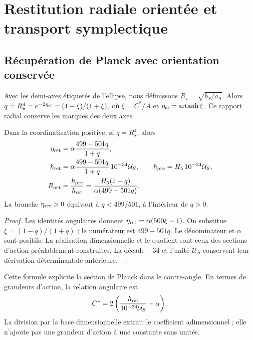 \section{Restitution radiale orientée et transport symplectique}
\subsection{Récupération de Planck avec orientation conservée}

Avec les demi-axes étiquetés de l’ellipse, nous définissons
\(R_\star=\sqrt{b_S/a_S}\). Alors
\(q=R_\star^4=e^{-2\eta_{\rm el}}=(1-\xi)/(1+\xi)\),
où \(\xi=C^*/A\) et \(\eta_{\rm el}=\operatorname{artanh}\xi\).
Ce rapport radial conserve les marques des deux axes.

\begin{theorem}
\label{rec:thm:accion}
Dans la coordinatisation positive, si \(q=R_\star^4\), alors
\begin{align}
 \eta_{\rm ret}&=\alpha\frac{499-501q}{1+q},\label{rec:eq:eta-radio}\\
 \hbar_{\rm ret}&=\alpha\frac{499-501q}{1+q}\,10^{-34}\mathcal U_S,
 \qquad\hbar_{\rm pre}=H_5\,10^{-34}\mathcal U_S,\label{rec:eq:planck-radio}\\
 R_{\rm act}&=\frac{\hbar_{\rm pre}}{\hbar_{\rm ret}}
 =\frac{H_5(1+q)}{\alpha(499-501q)}.\label{rec:eq:ratio-radio}
\end{align}
La branche \(\eta_{\rm ret}>0\) équivaut à \(q<499/501\), à l’intérieur de \(q>0\).

\end{theorem}
\begin{proof}
Les identités angulaires donnent \(\eta_{\rm ret}=\alpha(500\xi-1)\). On substitue \(\xi=(1-q)/(1+q)\) ; le numérateur est \(499-501q\). Le dénominateur et \(\alpha\) sont positifs. La réalisation dimensionnelle et le quotient sont ceux des sections d'action préalablement construites. La décade \(-34\) et l'unité \(\mathcal U_S\) conservent leur dérivation déterminantale antérieure.
\end{proof}

Cette formule explicite la section de Planck dans le contre-angle. En termes de grandeurs d’action, la relation angulaire est
\[
 C^*=2\left(\frac{\hbar_{\rm ret}}{10^{-34}\mathcal U_S}+\alpha\right).
\]
La division par la base dimensionnelle extrait le coefficient adimensionnel ; elle n’ajoute pas une grandeur d’action à une constante sans unités.


